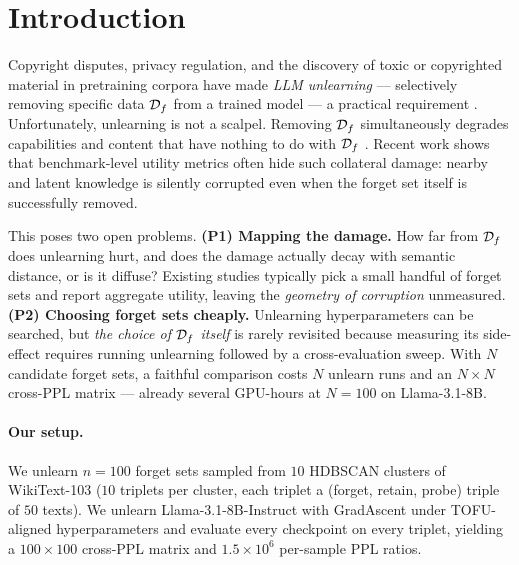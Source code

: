 \section{Introduction}
\label{sec:intro}

Copyright disputes, privacy regulation, and the discovery of toxic or copyrighted material in pretraining corpora have made \emph{LLM unlearning} --- selectively removing specific data $\mathcal{D}_f$ from a trained model --- a practical requirement \citep{maini2024tofu, shi2024muse, dorna2025openunlearning}. Unfortunately, unlearning is not a scalpel. Removing $\mathcal{D}_f$ simultaneously degrades capabilities and content that have nothing to do with $\mathcal{D}_f$ \citep{ko2025probing}. Recent work shows that benchmark-level utility metrics often hide such collateral damage: nearby and latent knowledge is silently corrupted even when the forget set itself is successfully removed.

This poses two open problems. \textbf{(P1) Mapping the damage.} How far from $\mathcal{D}_f$ does unlearning hurt, and does the damage actually decay with semantic distance, or is it diffuse? Existing studies typically pick a small handful of forget sets and report aggregate utility, leaving the \emph{geometry of corruption} unmeasured. \textbf{(P2) Choosing forget sets cheaply.} Unlearning hyperparameters can be searched, but \emph{the choice of $\mathcal{D}_f$ itself} is rarely revisited because measuring its side-effect requires running unlearning followed by a cross-evaluation sweep. With $N$ candidate forget sets, a faithful comparison costs $N$ unlearn runs and an $N\times N$ cross-PPL matrix --- already several GPU-hours at $N{=}100$ on Llama-3.1-8B.

\paragraph{Our setup.} We unlearn $n{=}100$ forget sets sampled from $10$ HDBSCAN clusters of WikiText-103 ($10$ triplets per cluster, each triplet a (forget, retain, probe) triple of $50$ texts). We unlearn Llama-3.1-8B-Instruct with GradAscent under TOFU-aligned hyperparameters \citep{maini2024tofu, dorna2025openunlearning} and evaluate every checkpoint on every triplet, yielding a $100\times100$ cross-PPL matrix and $1.5\!\times\!10^{6}$ per-sample PPL ratios.

